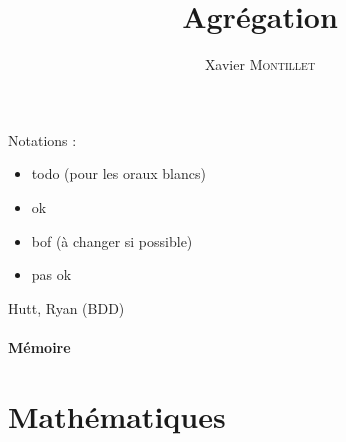\documentclass[10pt,a4paper,notitlepage]{report}
\newcommand{\green}[1]{
	\textcolor{OliveGreen}{#1}
}
\newcommand{\blue}[1]{
	\textcolor{blue}{#1}
}
\newcommand{\orange}[1]{
	\textcolor{orange}{#1}
}
\newcommand{\red}[1]{
	\textcolor{red}{#1}
}
\newcommand{\ok}{\green{\ding{52}}}
\newcommand{\todo}{\blue{\ding{228}}}
\newcommand{\bof}{\orange{\Yingyang}}
\newcommand{\nok}{\red{\ding{56}}}
\providecommand{\base}{.}
\begin{document}
\title{Agrégation}
\author{Xavier \textsc{Montillet}}
\maketitle

\newpage
Notations :
\begin{itemize}
	\item[\todo] todo (pour les oraux blancs)
	\item[\ok] ok
	\item[\bof] bof (à changer si possible)
	\item[\nok] pas ok
\end{itemize}



Hutt, Ryan (BDD)

\subsection{Mémoire}



\part{Mathématiques}

\newrefsegment
\end{document}
